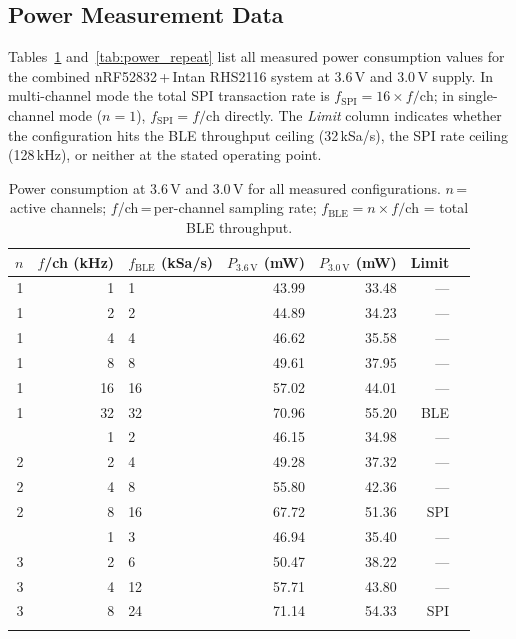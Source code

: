 \subsection{Power Measurement Data}
\label{app:power_data}

Tables~\ref{tab:power_3v6_3v} and~\ref{tab:power_repeat} list all measured
power consumption values for the combined nRF52832\,+\,Intan RHS2116 system
at 3.6\,V and 3.0\,V supply. In multi-channel mode the total SPI transaction
rate is $f_\text{SPI} = 16 \times f/\text{ch}$; in single-channel mode
($n=1$), $f_\text{SPI} = f/\text{ch}$ directly. The \textit{Limit} column
indicates whether the configuration hits the BLE throughput ceiling
(32\,kSa/s), the SPI rate ceiling (128\,kHz), or neither at the stated
operating point.

\begin{table}[htbp]
\centering
\caption{Power consumption at 3.6\,V and 3.0\,V for all measured configurations.
$n$\,=\,active channels; $f$/ch\,=\,per-channel sampling rate;
$f_\text{BLE} = n \times f/\text{ch}$ = total BLE throughput.}
\label{tab:power_3v6_3v}
\footnotesize
\begin{tabular}{@{}rrlrrrl@{}}
\toprule
$n$ & $f$/ch (kHz) & $f_\text{BLE}$ (kSa/s)
    & $P_{3.6\,\text{V}}$ (mW) & $P_{3.0\,\text{V}}$ (mW) & Limit \\
\midrule
1 &  1    &  1 & 43.99 & 33.48 & ---     \\
1 &  2    &  2 & 44.89 & 34.23 & ---     \\
1 &  4    &  4 & 46.62 & 35.58 & ---     \\
1 &  8    &  8 & 49.61 & 37.95 & ---     \\
1 & 16    & 16 & 57.02 & 44.01 & ---     \\
1 & 32    & 32 & 70.96 & 55.20 & BLE     \\
\addlinespace
2 &  1    &  2 & 46.15 & 34.98 & ---     \\
2 &  2    &  4 & 49.28 & 37.32 & ---     \\
2 &  4    &  8 & 55.80 & 42.36 & ---     \\
2 &  8    & 16 & 67.72 & 51.36 & SPI     \\
\addlinespace
3 &  1    &  3 & 46.94 & 35.40 & ---     \\
3 &  2    &  6 & 50.47 & 38.22 & ---     \\
3 &  4    & 12 & 57.71 & 43.80 & ---     \\
3 &  8    & 24 & 71.14 & 54.33 & SPI     \\
\addlinespace

\end{tabular}
\end{table}
